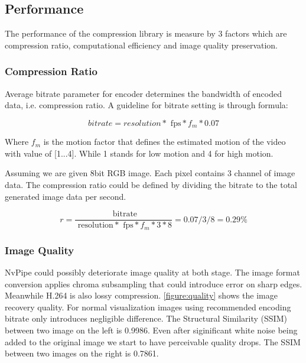 \documentclass{vgtc}                          %
\begin{document}
\subsection{Performance}

The performance of the compression library is measure by 3 factors which are compression ratio, computational efficiency and image quality preservation.

\subsubsection{Compression Ratio}

Average bitrate parameter for encoder determines the bandwidth of encoded data, i.e. compression ratio. A guideline for bitrate setting is through formula:

\begin{equation}
\label{formula:bitrate}
 bitrate = resolution * \text{ fps} * f_m * 0.07
\end{equation}

Where \(f_m\) is the motion factor that defines the estimated motion of the video with value of [1...4]. While 1 stands for low motion and 4 for high motion.

Assuming we are given 8bit RGB image. Each pixel contains 3 channel of image data. The compression ratio could be defined by dividing the bitrate to the total generated image data per second.

\begin{equation}
\label{formula:compress_ratio}
 r = \frac{ \text{ bitrate}}{ \text{ resolution} * \text{ fps} * f_m * 3 * 8} = 0.07/3/8 = 0.29\%
\end{equation}

\subsubsection{Image Quality}

NvPipe could possibly deteriorate image quality at both stage. The image format conversion applies chroma subsampling that could introduce error on sharp edges. Meanwhile H.264 is also lossy compression. \ref{figure:quality} shows the image recovery quality. For normal visualization images using recommended encoding bitrate only introduces negligible difference. The Structural Similarity (SSIM) between two image on the left is 0.9986. Even after siginificant white noise being added to the original image we start to have perceivable quality drops. The SSIM between two images on the right is 0.7861.
\end{document}

